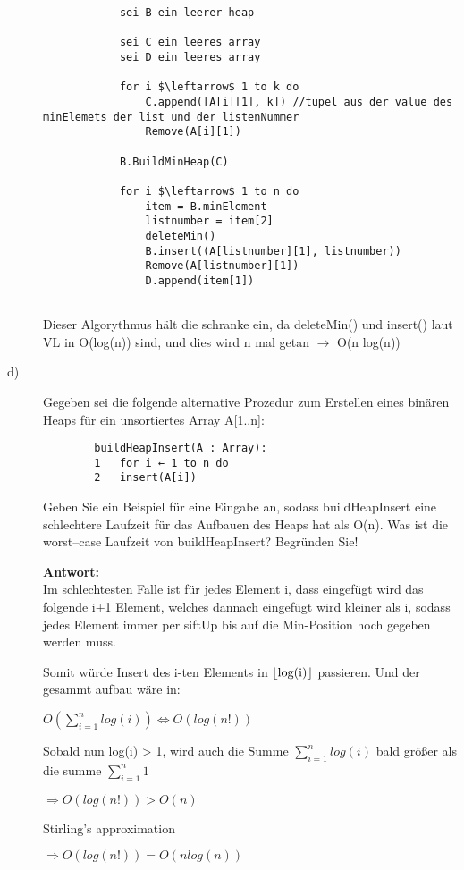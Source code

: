 \documentclass[12pt, a4paper, oneside]{article}
\begin{document}
\begin{description}
\begin{verbatim}
			sei B ein leerer heap
			
			sei C ein leeres array
			sei D ein leeres array
			
			for i $\leftarrow$ 1 to k do
				C.append([A[i][1], k]) //tupel aus der value des minElemets der list und der listenNummer
				Remove(A[i][1])
			
			B.BuildMinHeap(C)
							
			for i $\leftarrow$ 1 to n do
				item = B.minElement
				listnumber = item[2]
				deleteMin()
				B.insert((A[listnumber][1], listnumber))
				Remove(A[listnumber][1])
				D.append(item[1])
			
	\end{verbatim}

	Dieser Algorythmus hält die schranke ein, da deleteMin() und insert() laut VL in O(log(n)) sind, und dies wird n mal getan $\rightarrow$ O(n log(n))
	
	\item[d)] Gegeben sei die folgende alternative Prozedur zum Erstellen eines binären Heaps für
	ein unsortiertes Array A[1..n]:
	\begin{verbatim}
		buildHeapInsert(A : Array):
		1 	for i ← 1 to n do
		2 	insert(A[i])
	\end{verbatim}
	Geben Sie ein Beispiel für eine Eingabe an, sodass buildHeapInsert eine schlechtere
	Laufzeit für das Aufbauen des Heaps hat als O(n). Was ist die worst–case Laufzeit von
	buildHeapInsert? Begründen Sie!
	
	\textbf{Antwort:}\\
	Im schlechtesten Falle ist für jedes Element i, dass eingefügt wird das folgende i+1 Element, welches dannach eingefügt wird kleiner als i, sodass jedes Element immer per siftUp bis auf die Min-Position hoch gegeben werden muss.
	
	Somit würde Insert des i-ten Elements in \(\lfloor$log(i)$\rfloor\) passieren.
	Und der gesammt aufbau wäre in:
	
	\centerline{\(O(\sum^{n}_{i=1}log(i)) \Longleftrightarrow O(log(n!))\)}
	\centerline{   }
	
	Sobald nun log(i) > 1, wird auch die Summe \(\sum^{n}_{i=1}log(i)\) bald größer als die summe \(\sum^{n}_{i=1}1\) 
	
	\centerline{\(\Longrightarrow O(log(n!)) > O(n)\)}
	\centerline{Stirling's approximation}
	\centerline{\(\Longrightarrow O(log(n!)) = O(n log(n))\)}
	
	
\end{description}
	
\end{document}
